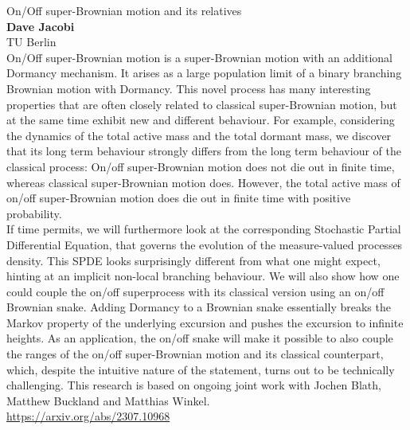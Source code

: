 \documentclass[12pt,a4paper]{article}
\begin{document}
\noindent
{\Large On/Off super-Brownian motion and its relatives}\\[1ex]
{\large 
\textbf{Dave Jacobi}\\[1ex] TU Berlin}\\[2ex]
On/Off super-Brownian motion is a super-Brownian motion with an additional Dormancy mechanism. It arises as a large population limit of a binary branching Brownian motion with Dormancy. This novel process has many interesting properties that are often closely related to classical super-Brownian motion, but at the same time exhibit new and different behaviour. For example, considering the dynamics of the total active mass and the total dormant mass, we discover that its long term behaviour strongly differs from the long term behaviour of the classical process: On/off super-Brownian motion does not die out in finite time, whereas classical super-Brownian motion does. However, the total active mass of on/off super-Brownian motion does die out in finite time with positive probability.
\\
If time permits, we will furthermore look at the corresponding Stochastic Partial Differential Equation, that governs the evolution of the measure-valued processes density. This SPDE looks surprisingly different from what one might expect, hinting at an implicit non-local branching behaviour. We will also show how one could couple the on/off superprocess with its classical version using an on/off Brownian snake. Adding Dormancy to a Brownian snake essentially breaks the Markov property of the underlying excursion and pushes the excursion to infinite heights. As an application, the on/off snake will make it possible to also couple the ranges of the on/off super-Brownian motion and its classical counterpart, which, despite the intuitive nature of the statement, turns out to be technically challenging.
This research is based on ongoing joint work with Jochen Blath, Matthew Buckland and Matthias Winkel. 
\\\url{https://arxiv.org/abs/2307.10968}

\bigskip \bigskip  %

\end{document}
